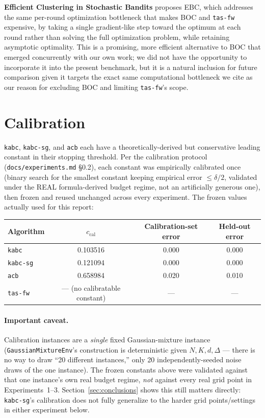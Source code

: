 \documentclass[11pt]{article}
\begin{document}
\textbf{Efficient Clustering in Stochastic Bandits} \cite{ebc2026}
proposes EBC, which addresses the same per-round optimization bottleneck
that makes BOC and \texttt{tas-fw} expensive, by taking a single
gradient-like step toward the optimum at each round rather than solving
the full optimization problem, while retaining asymptotic optimality.
This is a promising, more efficient alternative to BOC that emerged
concurrently with our own work; we did not have the opportunity to
incorporate it into the present benchmark, but it is a natural inclusion
for future comparison given it targets the exact same computational
bottleneck we cite as our reason for excluding BOC and limiting
\texttt{tas-fw}'s scope.

\FloatBarrier
\section{Calibration}
\label{sec:calibration}

\texttt{kabc}, \texttt{kabc-sg}, and \texttt{acb} each have a theoretically-derived
but conservative leading constant in their stopping threshold. Per the
calibration protocol (\texttt{docs/experiments.md} \S0.2), each constant was
empirically calibrated once (binary search for the smallest constant keeping
empirical error $\le \delta/2$, validated under the REAL formula-derived
budget regime, not an artificially generous one), then frozen and reused
unchanged across every experiment. The frozen values actually used for this
report:

\begin{table}[h]
\centering
\begin{tabular}{lccc}
\toprule
Algorithm & $c_{\text{cal}}$ & Calibration-set error & Held-out error \\
\midrule
\texttt{kabc} & 0.103516 & 0.000 & 0.000 \\
\texttt{kabc-sg} & 0.121094 & 0.000 & 0.000 \\
\texttt{acb} & 0.658984 & 0.020 & 0.010 \\
\texttt{tas-fw} & --- (no calibratable constant) & --- & --- \\
\bottomrule
\end{tabular}
\end{table}

\paragraph{Important caveat.} Calibration instances are a \emph{single}
fixed Gaussian-mixture instance (\texttt{GaussianMixtureEnv}'s construction
is deterministic given $N,K,d,\Delta$ --- there is no way to draw ``20
different instances,'' only 20 independently-seeded noise draws of the one
instance). The frozen constants above were validated against that one
instance's own real budget regime, \emph{not} against every real grid point
in Experiments~1--3. Section~\ref{sec:conclusions} shows this still matters
directly: \texttt{kabc-sg}'s calibration does not fully generalize to the
harder grid points/settings in either experiment below.
\end{document}
